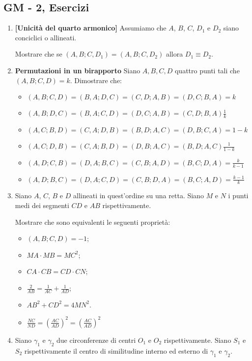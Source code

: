 \subsection{GM - 2, Esercizi}
\begin{enumerate}

	\item \textbf{[Unicità del quarto armonico]}
	Assumiamo che $A$, $B$, $C$, $D_1$ e $D_2$ siano conciclici o allineati.
	
	Mostrare che se $(A,B;C,D_1)=(A,B;C,D_2)$ allora $D_1 \equiv D_2$.
	
	\item \textbf{Permutazioni in un birapporto} Siano $A,B,C,D$ quattro punti tali che $(A,B;C,D)=k$. Dimostrare che:
	\begin{itemize}
	 \item $(A,B;C,D)=(B,A;D,C)=(C,D;A,B)=(D,C;B,A)=k$
	 \item $(A,B;D,C)=(B,A;C,D)=(D,C;A,B)=(C,D;B,A)\frac{1}{k}$
	 \item $(A,C;B,D)=(C,A;D,B)=(B,D;A,C)=(D,B;C,A)=1-k$
	 \item $(A,C;D,B)=(C,A;B,D)=(D,B;A,C)=(B,D;A,C)\frac{1}{1-k}$
	 \item $(A,D;C,B)=(D,A;B,C)=(C,B;A,D)=(B,C;D,A)=\frac{k}{k-1}$
	 \item $(A,D;B,C)=(D,A;C,D)=(C,B;D,A)=(B,C;A,D)=\frac{k-1}{k}$
	\end{itemize}

	
	\item Siano $A$, $C$, $B$ e $D$ allineati in quest'ordine su una retta. Siano $M$ e $N$ i punti medi dei segmenti
	$CD$ e $AB$ rispettivamente. 
	
	Mostrare che sono equivalenti le seguenti proprietà:
	\begin{itemize}
		\item $(A,B;C,D)=-1$;
		\item $MA\cdot MB=MC^2$;
		\item $CA\cdot CB=CD\cdot CN$;
		\item $\displaystyle\frac{2}{AB}=\displaystyle\frac{1}{AC}+
		\displaystyle\frac{1}{AD}$;
		\item $AB^2+CD^2=4MN^2$.
		\item $\frac{NC}{ND}=\left(\frac{AC}{AD}\right)^2=\left(\frac{AC}{AD}\right)^2$
	\end{itemize}
	\item Siano $\gamma_1$ e $\gamma_2$ due circonferenze di centri $O_1$ e $O_2$ rispettivamente. Siano $S_1$ e $S_2$ rispettivamente il centro di similitudine interno ed esterno di $\gamma_1$ e $\gamma_2$.
	

\end{enumerate}
